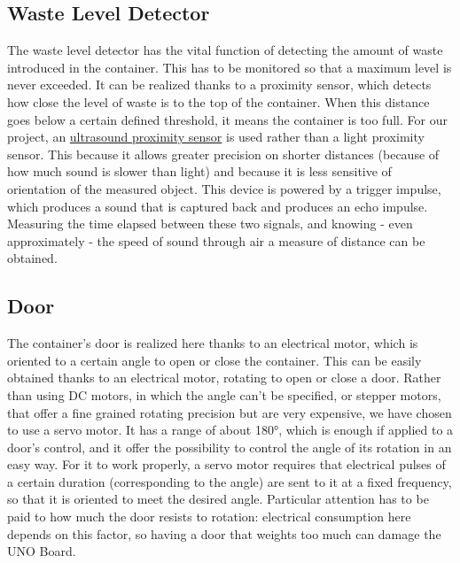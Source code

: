 \documentclass[a4paper,12pt]{report}
\begin{document}
	\subsection{Waste Level Detector}
	The waste level detector has the vital function of detecting the amount of waste introduced in the container. This has to be monitored so that a maximum level is never exceeded.\newline
	It can be realized thanks to a proximity sensor, which detects how close the level of waste is to the top of the container. When this distance goes below a certain defined threshold, it means the container is too full. For our project, an \href{https://docs.google.com/document/d/1Y-yZnNhMYy7rwhAgyL_pfa39RsB-x2qR4vP8saG73rE/edit?tab=t.0}{ultrasound proximity sensor} is used rather than a light proximity sensor. This because it allows greater precision on shorter distances (because of how much sound is slower than light) and because it is less sensitive of orientation of the measured object. This device is powered by a trigger impulse, which produces a sound that is captured back and produces an echo impulse. Measuring the time elapsed between these two signals, and knowing - even approximately - the speed of sound through air a measure of distance can be obtained.
	
	\subsection{Door}
	The container's door is realized here thanks to an electrical motor, which is oriented to a certain angle to open or close the container.\newline
	This can be easily obtained thanks to an electrical motor, rotating to open or close a door. Rather than using DC motors, in which the angle can't be specified, or stepper motors, that offer a fine grained rotating precision but are very expensive, we have chosen to use a servo motor. It has a range of about 180°, which is enough if applied to a door's control, and it offer the possibility to control the angle of its rotation in an easy way. For it to work properly, a servo motor requires that electrical pulses of a certain duration (corresponding to the angle) are sent to it at a fixed frequency, so that it is oriented to meet the desired angle. Particular attention has to be paid to how much the door resists to rotation: electrical consumption here depends on this factor, so having a door that weights too much can damage the UNO Board.
	
\end{document}
